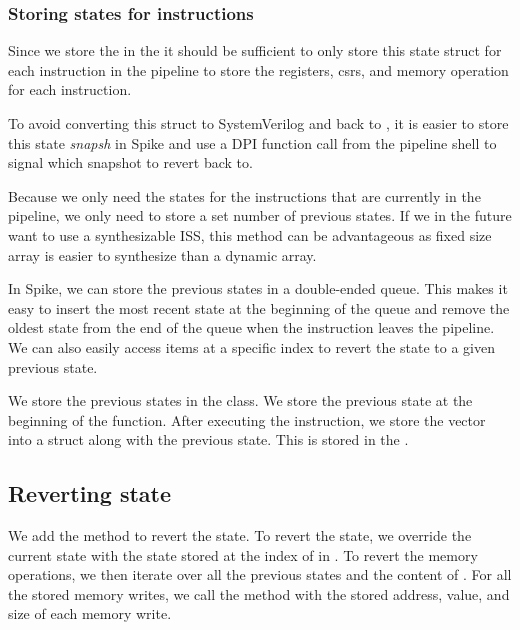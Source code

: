 \subsubsection{Storing states for instructions}

Since we store the  in the  it should be sufficient to only store this state struct for each instruction in the pipeline to store the registers, \acrshort{csr}s, and memory operation for each instruction. 

To avoid converting this struct to SystemVerilog and back to \cpp, it is easier to store this state \textit{snapsh} in Spike and use a DPI function call from the pipeline shell to signal which snapshot to revert back to.

Because we only need the states for the instructions that are currently in the pipeline, we only need to store a set number of previous states. If we in the future want to use a synthesizable ISS, this method can be advantageous as fixed size array is easier to synthesize than a dynamic array.

In Spike, we can store the previous states in a  double-ended queue. This makes it easy to insert the most recent state at the beginning of the queue and remove the oldest state from the end of the queue when the instruction leaves the pipeline. 
We can also easily access items at a specific index to revert the state to a given previous state.

We store the previous states in the  class. We store the previous state at the beginning of the  function. After executing the instruction, we store the  vector into a  struct along with the previous state. This is stored in the  .



\subsection{Reverting state}

We add the  method to revert the state.
To revert the state, we override the current state with the state stored at the index of  in . To revert the memory operations, we then iterate over all the previous states and the content of . For all the stored memory writes, we call the  method with the stored address, value, and size of each memory write.


